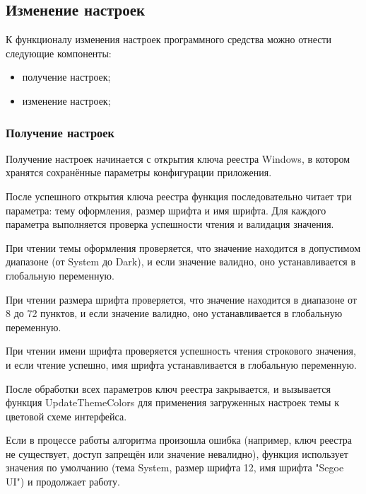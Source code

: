 \subsection{Изменение настроек}

К функционалу изменения настроек программного средства можно отнести следующие компоненты:

\begin{itemize}
    \item получение настроек;
    \item изменение настроек;
\end{itemize}

\subsubsection{Получение настроек}

Получение настроек начинается с открытия ключа реестра Windows, в котором хранятся сохранённые параметры конфигурации приложения.

После успешного открытия ключа реестра функция последовательно читает три параметра: тему оформления, размер шрифта и имя шрифта. Для каждого параметра выполняется проверка успешности чтения и валидация значения.

При чтении темы оформления проверяется, что значение находится в допустимом диапазоне (от System до Dark), и если значение валидно, оно устанавливается в глобальную переменную.

При чтении размера шрифта проверяется, что значение находится в диапазоне от 8 до 72 пунктов, и если значение валидно, оно устанавливается в глобальную переменную.

При чтении имени шрифта проверяется успешность чтения строкового значения, и если чтение успешно, имя шрифта устанавливается в глобальную переменную.

После обработки всех параметров ключ реестра закрывается, и вызывается функция UpdateThemeColors для применения загруженных настроек темы к цветовой схеме интерфейса.

Если в процессе работы алгоритма произошла ошибка (например, ключ реестра не существует, доступ запрещён или значение невалидно), функция использует значения по умолчанию (тема System, размер шрифта 12, имя шрифта "Segoe UI") и продолжает работу.

